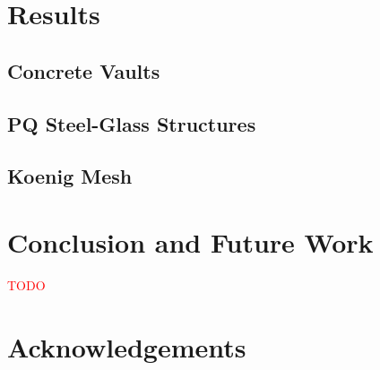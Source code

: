 \documentclass[annual]{acmsiggraph}
\newcommand{\todo}[1]{\textcolor{red}{#1}}
\begin{document}
\section{Results} \label{sec:results}

\subsection{Concrete Vaults}

\subsection{PQ Steel-Glass Structures}

\subsection{Koenig Mesh} \label{sec:koenig}



\section{Conclusion and Future Work}

\todo{TODO}

\section*{Acknowledgements}



\end{document}
